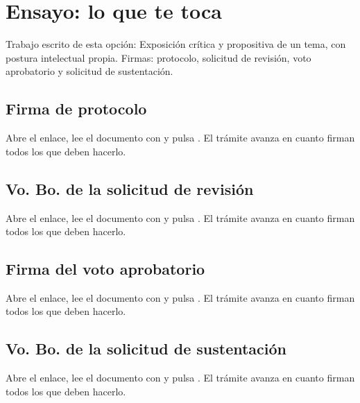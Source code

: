 \section{Ensayo: lo que te toca}
Trabajo escrito de esta opción: Exposición crítica y propositiva de un tema, con postura intelectual propia. Firmas: protocolo, solicitud de revisión, voto aprobatorio y solicitud de sustentación.
\subsection{Firma de protocolo}
Abre el enlace, lee el documento con  y pulsa . El trámite avanza en cuanto firman todos los que deben hacerlo.
\subsection{Vo. Bo. de la solicitud de revisión}
Abre el enlace, lee el documento con  y pulsa . El trámite avanza en cuanto firman todos los que deben hacerlo.
\subsection{Firma del voto aprobatorio}
Abre el enlace, lee el documento con  y pulsa . El trámite avanza en cuanto firman todos los que deben hacerlo.
\subsection{Vo. Bo. de la solicitud de sustentación}
Abre el enlace, lee el documento con  y pulsa . El trámite avanza en cuanto firman todos los que deben hacerlo.
